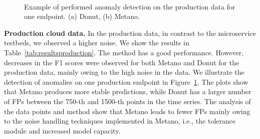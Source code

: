 \begin{figure}[!t]
     \centering
     \\
     \caption{Example of performed anomaly detection on the production data for one endpoint. (a) Donut, (b) Metano.}
     \label{fig:productionplotresults}
\end{figure}



\noindent\textbf{Production cloud data.} 
In the production data, in contrast to the microservice testbeds, we observed a higher noise. We show the results in Table~\ref{tab:resultsproduction}. The method has a good performance. However, decreases in the F1 scores were observed for both Metano and Donut for the production data, mainly owing to the high noise in the data. We illustrate the detection of anomalies on one production endpoint in Figure~\ref{fig:productionplotresults}. The plots show that 
Metano produces more stable predictions, while Donut has a larger number of FPs between the 750-th and 1500-th points in the time series. The analysis of the data points and method show that Metano leads to fewer FPs mainly owing to the noise handling techniques implemented in Metano, i.e., the tolerance module and increased model capacity.

